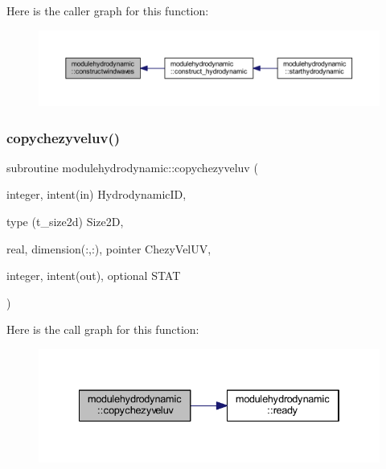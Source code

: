 Here is the caller graph for this function\+:\nopagebreak
\begin{figure}[H]
\begin{center}
\leavevmode
\includegraphics[width=350pt]{namespacemodulehydrodynamic_acf1676d4429b32307257ed7006fc59e1_icgraph}
\end{center}
\end{figure}
\mbox{\label{namespacemodulehydrodynamic_a7f81263a032159db07514b5cfba12a65}} 
\subsubsection{\texorpdfstring{copychezyveluv()}{copychezyveluv()}}
{\footnotesize\ttfamily subroutine modulehydrodynamic\+::copychezyveluv (\begin{DoxyParamCaption}\item[{integer, intent(in)}]{Hydrodynamic\+ID,  }\item[{type (t\+\_\+size2d)}]{Size2D,  }\item[{real, dimension(\+:,\+:), pointer}]{Chezy\+Vel\+UV,  }\item[{integer, intent(out), optional}]{S\+T\+AT }\end{DoxyParamCaption})\hspace{0.3cm}{\ttfamily [private]}}

Here is the call graph for this function\+:\nopagebreak
\begin{figure}[H]
\begin{center}
\leavevmode
\includegraphics[width=334pt]{namespacemodulehydrodynamic_a7f81263a032159db07514b5cfba12a65_cgraph}
\end{center}
\end{figure}
\mbox{\label{namespacemodulehydrodynamic_af9f7b027775cfbeb5d359cec2be0b0ad}} 
